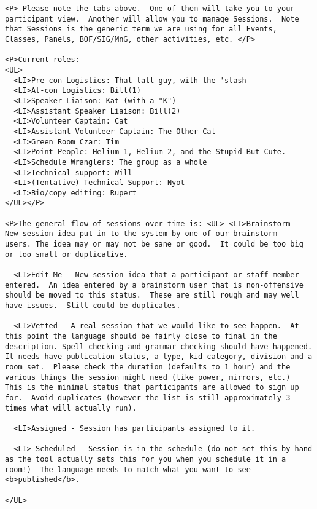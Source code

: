 \documentclass[captions=tablesignature]{scrartcl}
\begin{document}
\begin{verbatim}
<P> Please note the tabs above.  One of them will take you to your
participant view.  Another will allow you to manage Sessions.  Note
that Sessions is the generic term we are using for all Events,
Classes, Panels, BOF/SIG/MnG, other activities, etc. </P>

<P>Current roles:
<UL>
  <LI>Pre-con Logistics: That tall guy, with the 'stash
  <LI>At-con Logistics: Bill(1)
  <LI>Speaker Liaison: Kat (with a "K")
  <LI>Assistant Speaker Liaison: Bill(2)
  <LI>Volunteer Captain: Cat
  <LI>Assistant Volunteer Captain: The Other Cat
  <LI>Green Room Czar: Tim
  <LI>Point People: Helium 1, Helium 2, and the Stupid But Cute.
  <LI>Schedule Wranglers: The group as a whole
  <LI>Technical support: Will
  <LI>(Tentative) Technical Support: Nyot
  <LI>Bio/copy editing: Rupert
</UL></P>

<P>The general flow of sessions over time is: <UL> <LI>Brainstorm -
New session idea put in to the system by one of our brainstorm
users. The idea may or may not be sane or good.  It could be too big
or too small or duplicative.

  <LI>Edit Me - New session idea that a participant or staff member
entered.  An idea entered by a brainstorm user that is non-offensive
should be moved to this status.  These are still rough and may well
have issues.  Still could be duplicates.

  <LI>Vetted - A real session that we would like to see happen.  At
this point the language should be fairly close to final in the
description. Spell checking and grammar checking should have happened.
It needs have publication status, a type, kid category, division and a
room set.  Please check the duration (defaults to 1 hour) and the
various things the session might need (like power, mirrors, etc.)
This is the minimal status that participants are allowed to sign up
for.  Avoid duplicates (however the list is still approximately 3
times what will actually run).

  <LI>Assigned - Session has participants assigned to it.

  <LI> Scheduled - Session is in the schedule (do not set this by hand
as the tool actually sets this for you when you schedule it in a
room!)  The language needs to match what you want to see
<b>published</b>.

</UL>
\end{verbatim}
\end{document}
